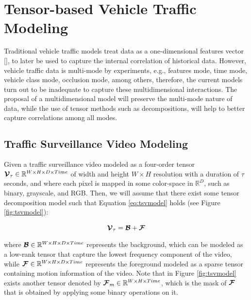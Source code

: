 \documentclass[sensors,article,submit,moreauthors,pdftex]{Definitions/mdpi}
\newcommand{\mathten}[1]{\boldsymbol{\mathbf{\mathcal{\MakeUppercase{#1}}}}}
\begin{document}
\section{Tensor-based Vehicle Traffic Modeling}
Traditional vehicle traffic models treat data as a one-dimensional features vector [], to later be used to capture the internal correlation of historical data. However, vehicle traffic data is multi-mode by experiments, e.g., features mode, time mode, vehicle class mode, occlusion mode, among others, therefore, the current models turn out to be inadequate to capture these multidimensional interactions. The proposal of a multidimensional model will preserve the multi-mode nature of data, while the use of tensor methods such as decompositions, will help to better capture correlations among all modes.

\subsection{Traffic Surveillance Video Modeling}

Given a traffic surveillance video modeled as a four-order tensor $\mathten{V}_\tau \in \mathbb{R}^{W\times H \times D \times Time}$ of width and height $W \times H$ resolution with a duration of $\tau$ seconds, and where each pixel is mapped in some color-space in $\mathbb{R}^D$, such as binary, grayscale, and RGB. Then, we will assume that there exist some tensor decomposition model such that Equation \ref{eq:tsvmodel} holds (see Figure \ref{fig:tsvmodel}):

\begin{equation}
\mathten{V}_\tau = \mathten{B} + \mathten{F}
\label{eq:tsvmodel}
\end{equation}

where $\mathten{B} \in \mathbb{R}^{W\times H \times D \times Time}$ represents the background, which can be modeled as a low-rank tensor that capture the lowest frequency component of the video, while $\mathten{F} \in \mathbb{R}^{W\times H \times D \times Time}$ represents the foreground modeled as a sparse tensor containing motion information of the video. Note that in Figure \ref{fig:tsvmodel} exists another tensor denoted by $\mathten{F}_m \in \mathbb{R}^{W\times H \times Time}$, which is the mask of $\mathten{F}$ that is obtained by applying some binary operations on it.
\end{document}
